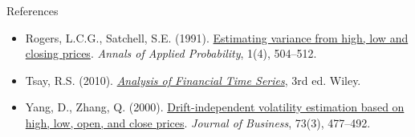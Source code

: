 \begin{frame}{References}
\begin{itemize}
    \item Rogers, L.C.G., Satchell, S.E. (1991). \href{https://doi.org/10.1214/aoap/1177005835}{Estimating variance from high, low and closing prices}. \textit{Annals of Applied Probability}, 1(4), 504--512.
    \item Tsay, R.S. (2010). \href{https://doi.org/10.1002/9780470644560}{\textit{Analysis of Financial Time Series}}, 3rd ed. Wiley.
    \item Yang, D., Zhang, Q. (2000). \href{https://doi.org/10.1086/209650}{Drift-independent volatility estimation based on high, low, open, and close prices}. \textit{Journal of Business}, 73(3), 477--492.
\end{itemize}
\end{frame}


